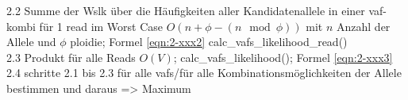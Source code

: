 \begin{itemize}
\end{itemize}

2.2 Summe der Wslk über die Häufigkeiten aller Kandidatenallele in einer vaf-kombi für 1 read im Worst Case $O(n + \phi - (n \mod \phi))$ mit $n$ Anzahl der Allele und $\phi$ ploidie; Formel \eqref{eqn:2-xxx2} calc\_vafs\_likelihood\_read()\\ 

2.3 Produkt für alle Reads $O(V)$; calc\_vafs\_likelihood(); Formel \eqref{eqn:2-xxx3}\\ 

2.4 schritte 2.1 bis 2.3 für alle vafs/für alle Kombinationsmöglichkeiten der Allele bestimmen und daraus => Maximum \\

